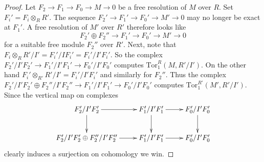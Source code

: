 \documentclass[10pt,a4paper]{amsart}
\theoremstyle{plain}
\theoremstyle{definition}
\theoremstyle{remark}
\numberwithin{equation}{subsection}
\begin{document}
\begin{proof}
Let $F_2 \to F_1 \to F_0 \to M \to 0$ be a free resolution of
$M$ over $R$. Set $F_i' = F_i \otimes_R R'$. The sequence
$F_2' \to F_1' \to F_0' \to M' \to 0$ may no longer be exact
at $F_1'$. A free resolution of $M'$ over $R'$ therefore looks
like
$$
F_2' \oplus F_2'' \to F_1' \to F_0' \to M' \to 0
$$
for a suitable free module $F_2''$ over $R'$. Next, note that
$F_i \otimes_R R'/I' = F_i' / IF_i' = F_i'/I'F_i'$.
So the complex $F_2'/I'F_2' \to F_1'/I'F_1' \to F_0'/I'F_0'$
computes $\text{Tor}_1^R(M, R'/I')$. On the other hand
$F_i' \otimes_{R'} R'/I' = F_i'/I'F_i'$ and similarly
for $F_2''$. Thus the complex
$F_2'/I'F_2' \oplus F_2''/I'F_2'' \to F_1'/I'F_1' \to F_0'/I'F_0'$
computes $\text{Tor}_1^{R'}(M', R'/I')$. Since the vertical
map on complexes
$$
\xymatrix{
F_2'/I'F_2' \ar[r] \ar[d] &
F_1'/I'F_1' \ar[r] \ar[d] &
F_0'/I'F_0' \ar[d] \\
F_2'/I'F_2' \oplus F_2''/I'F_2'' \ar[r] &
F_1'/I'F_1' \ar[r] &
F_0'/I'F_0'
}
$$
clearly induces a surjection on cohomology we win.
\end{proof}
\end{document}
